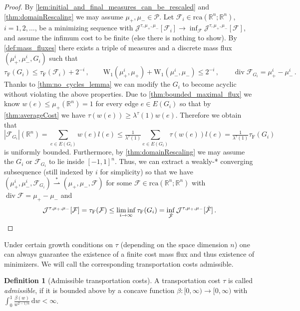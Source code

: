 \documentclass[10pt,a4paper,oneside,final]{article}
\newcommand{\R}{{\mathbb{R}}}
\newcommand{\de}{{\mathrm{d}}}
\DeclareMathOperator{\dv}{div}
\newcommand{\rca}{\mathrm{rca}}
\newcommand{\prob}{{\mathcal{P}}}
\newcommand{\weakstarto}{\stackrel{*}{\rightharpoonup}}
\newcommand{\Wd}[1]{\mathrm{W}_{#1}}
\newcommand{\Wdone}{\Wd{1}}
\newcommand{\flux}{{\mathcal{F}}}
\newcommand{\JEn}{{\mathcal{J}}}
\newcommand{\JEnXia}[1][\tau]{#1_{\mathrm{F}}}%
\newcommand{\transportPath}{mass flux}
\numberwithin{equation}{section}
\theoremstyle{plain}
\theoremstyle{definition}
\newtheorem{definition}[theorem]{Definition}
\theoremstyle{remark}
\begin{document}
\begin{proof}
By \cref{lem:initial_and_final_measures_can_be_rescaled} and \cref{thm:domainRescaling} we may assume $\mu_+,\mu_-\in\prob$.
Let $\flux_i\in\rca(\R^n;\R^n)$, $i=1,2,\ldots$, be a minimizing sequence with $\JEn^{\tau,\mu_+,\mu_-}[\flux_i]\to\inf_\flux \JEn^{\tau,\mu_+,\mu_-}[\flux]$, and assume the infimum cost to be finite (else there is nothing to show).
By \cref{def:mass_fluxes} there exists a triple of measures and a discrete \transportPath{} $(\mu_+^i,\mu_-^i,G_i)$ such that
\begin{equation*}
 \JEnXia(G_i) \leq \JEnXia(\flux_i) + 2^{-i}\,,\qquad
 \Wdone(\mu_+^i,\mu_+) + \Wdone(\mu_-^i,\mu_-) \leq 2^{-i}\,,\qquad
 \dv\flux_{G_i}=\mu_+^i-\mu_-^i\,.
\end{equation*}
Thanks to \cref{thm:no_cycles_lemma} we can modify the $G_i$ to become acyclic without violating the above properties.
Due to \cref{thm:bounded_maximal_flux} we know $w(e)\leq\mu_+(\R^n)=1$ for every edge $e \in E(G_i)$
so that by \cref{thm:averageCost} we have
$
\tau(w(e))\geq\lambda^\tau(1) w(e).
$
Therefore we obtain that
\begin{equation*}
|\flux_{G_i}|(\R^n)=\sum_{e\in E(G_i)}w(e)l(e)\leq\tfrac1{\lambda^\tau(1)}\sum_{e\in E(G_i)}\tau(w(e))l(e)=\tfrac1{\lambda^\tau(1)}\JEnXia(G_i)
\end{equation*}
is uniformly bounded.
Furthermore, by \cref{thm:domainRescaling} we may assume the $G_i$ or $\flux_{G_i}$ to lie inside $[-1,1]^n$.
Thus, we can extract a \mbox{weakly-*} converging subsequence (still indexed by $i$ for simplicity) so that we have $(\mu_+^i,\mu_-^i,\flux_{G_i})\weakstarto(\mu_+,\mu_-,\flux)$ for some $\flux\in\rca(\R^n;\R^n)$ with $\dv\flux=\mu_+-\mu_-$ and
\begin{equation*}
\JEn^{\tau,\mu_+,\mu_-}[\flux]=\JEnXia(\flux)\leq\liminf_{i\to\infty}\JEnXia(G_i)=\inf_{\tilde\flux}\JEn^{\tau,\mu_+,\mu_-}[\tilde\flux]\,.\qedhere
\end{equation*}
\end{proof}

Under certain growth conditions on $\tau$ (depending on the space dimension $n$) one can always guarantee the existence of a finite cost \transportPath{} and thus existence of minimizers.
We will call the corresponding transportation costs admissible.

\begin{definition}[Admissible transportation costs]\label{def:admissible}
A transportation cost $\tau$ is called \emph{admissible}, if it is bounded above by a concave function $\beta:[0,\infty)\to[0,\infty)$ with $\int_0^1\frac{\beta(w)}{w^{2-1/n}}\,\de w<\infty$.
\end{definition}
\end{document}

